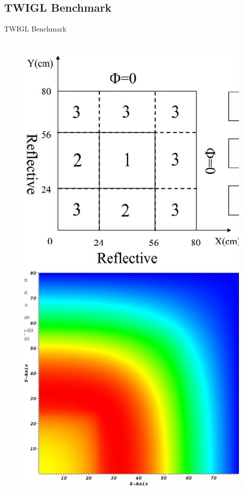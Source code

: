 \documentclass[8pt,xcolor=dvipnames]{beamer}
\begin{document}
\subsection{TWIGL Benchmark}

\begin{frame}{TWIGL Benchmark}

\begin{columns}
\column{\dimexpr\paperwidth-10pt}
\begin{figure}
\includegraphics[width=0.5\linewidth]{figures/twigl_geom.png}
\includegraphics[width=0.5\linewidth]{figures/ndiff_ramp_flux.jpg}
\end{figure}
\end{columns}

\end{frame}
\end{document}
